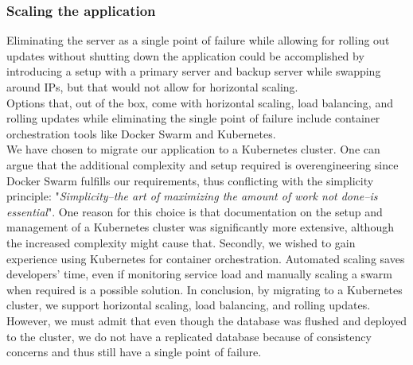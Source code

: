 \subsubsection{Scaling the application}
\label{subsubsec:scalingApp}
Eliminating the server as a single point of failure while allowing for rolling out updates without shutting down the application could be accomplished by introducing a setup with a primary server and backup server while swapping around IPs, but that would not allow for horizontal scaling.\\
Options that, out of the box, come with horizontal scaling, load balancing, and rolling updates while eliminating the single point of failure include container orchestration tools like Docker Swarm and Kubernetes.\\ 
We have chosen to migrate our application to a Kubernetes cluster. One can argue that the additional complexity and setup required is overengineering since Docker Swarm fulfills our requirements, thus conflicting with the simplicity principle: "\textit{Simplicity--the art of maximizing the amount of work not done--is essential}"\cite{beck2001agile}. 
One reason for this choice is that documentation on the setup and management of a Kubernetes cluster was significantly more extensive, although the increased complexity might cause that. Secondly, we wished to gain experience using Kubernetes for container orchestration. Automated scaling saves developers' time, even if monitoring service load and manually scaling a swarm when required is a possible solution. In conclusion, by migrating to a Kubernetes cluster, we support horizontal scaling, load balancing, and rolling updates. However, we must admit that even though the database was flushed and deployed to the cluster, we do not have a replicated database because of consistency concerns and thus still have a single point of failure.

